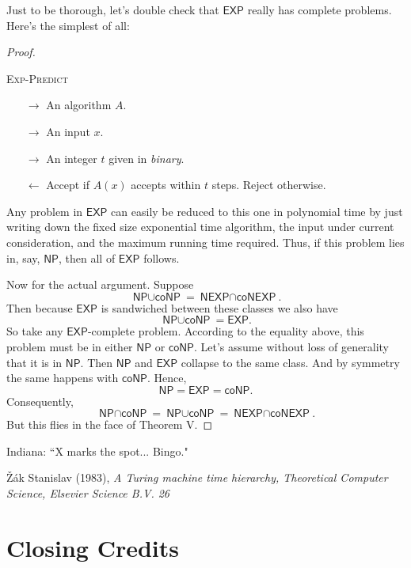 \documentclass{article}
\newcommand{\EXP}{\ensuremath{\textsf{EXP}}}
\newcommand{\NP}{\ensuremath{\textsf{NP}}}
\newcommand{\coNP}{\ensuremath{\textsf{coNP}}}
\newcommand{\interP}{\ensuremath{\textsf{NP}\cap\textsf{coNP}}}
\newcommand{\interEXP}{\ensuremath{\textsf{NEXP}\cap\textsf{coNEXP}}}
\newcommand{\unionP}{\ensuremath{\textsf{NP}\cup\textsf{coNP}}}
\begin{document}
Just to be thorough, let's double check that $\EXP$ really has complete problems. Here's the simplest of all:

\begin{proof}
\begin{mdframed}
\textsc{Exp-Predict}
\begin{itemize}[noitemsep,topsep=0.3em]
\item[$\longrightarrow$] An algorithm $A$.
\item[$\longrightarrow$] An input $x$.
\item[$\longrightarrow$] An integer $t$ given in \textit{binary}.
\end{itemize}
\begin{itemize}[noitemsep,topsep=0.3em]
\item[$\longleftarrow$] Accept if $A(x)$ accepts within $t$ steps. Reject otherwise.
\end{itemize}
\end{mdframed}
Any problem in $\EXP$ can easily be reduced to this one in polynomial time by just writing down the fixed size exponential time algorithm, the input under current consideration, and the maximum running time required. Thus, if this problem lies in, say, $\NP$, then all of $\EXP$ follows.

Now for the actual argument. Suppose
\[
\unionP = \interEXP.
\]
Then because $\EXP$ is sandwiched between these classes we also have
\[
\unionP = \EXP.
\]
So take any $\EXP$-complete problem. According to the equality above, this problem must be in either $\NP$ or $\coNP$. Let's assume without loss of generality that it is in $\NP$. Then $\NP$ and $\EXP$ collapse to the same class. And by symmetry the same happens with $\coNP$. Hence,
\[
\NP = \EXP = \coNP.
\]
Consequently,
\[
\interP = \unionP = \interEXP.
\]
But this flies in the face of Theorem V. \lightning
\end{proof}

Indiana: ``X marks the spot... Bingo."

\begin{thebibliography}{1}
Žák Stanislav (1983), \textit{A Turing machine time hierarchy, Theoretical Computer Science, Elsevier Science B.V. 26}
\end{thebibliography}

\section*{Closing Credits}
\end{document}
